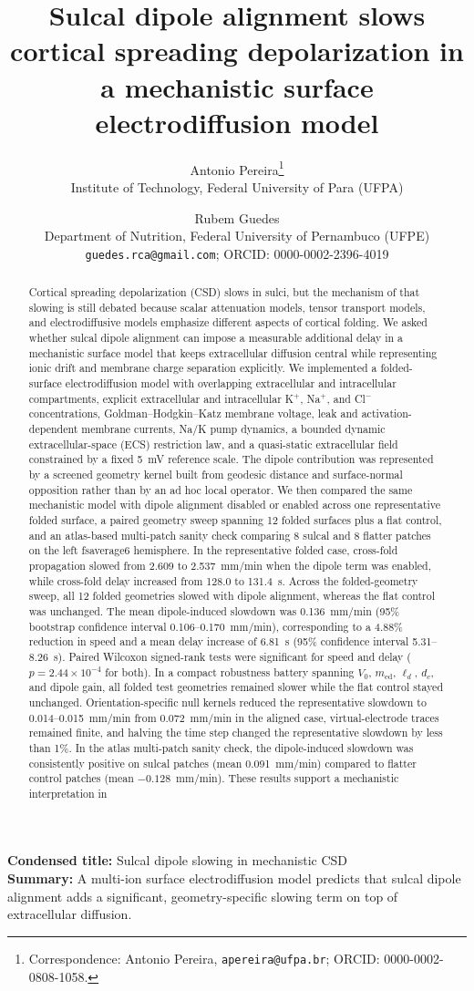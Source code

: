 \documentclass[12pt]{article}
\title{Sulcal dipole alignment slows cortical spreading depolarization in a mechanistic surface electrodiffusion model}
\author{
Antonio Pereira\thanks{Correspondence: Antonio Pereira, \texttt{apereira@ufpa.br}; ORCID: 0000-0002-0808-1058.}\\
\small Institute of Technology, Federal University of Para (UFPA)
\and
Rubem Guedes\\
\small Department of Nutrition, Federal University of Pernambuco (UFPE)\\
\small \texttt{guedes.rca@gmail.com}; ORCID: 0000-0002-2396-4019
}
\date{}
\newcommand{\ShortTitle}{Sulcal dipole slowing in mechanistic CSD}
\newcommand{\TOCSummary}{A multi-ion surface electrodiffusion model predicts that sulcal dipole alignment adds a significant, geometry-specific slowing term on top of extracellular diffusion.}
\begin{document}
\maketitle

\begin{center}
\parbox{0.95\textwidth}{\small
\textbf{Condensed title:} \ShortTitle\\
\textbf{Summary:} \TOCSummary}
\end{center}

\begin{abstract}
Cortical spreading depolarization (CSD) slows in sulci, but the mechanism of that slowing is still debated because scalar attenuation models, tensor transport models, and electrodiffusive models emphasize different aspects of cortical folding. We asked whether sulcal dipole alignment can impose a measurable additional delay in a mechanistic surface model that keeps extracellular diffusion central while representing ionic drift and membrane charge separation explicitly. We implemented a folded-surface electrodiffusion model with overlapping extracellular and intracellular compartments, explicit extracellular and intracellular K$^+$, Na$^+$, and Cl$^-$ concentrations, Goldman--Hodgkin--Katz membrane voltage, leak and activation-dependent membrane currents, Na/K pump dynamics, a bounded dynamic extracellular-space (ECS) restriction law, and a quasi-static extracellular field constrained by a fixed 5~mV reference scale. The dipole contribution was represented by a screened geometry kernel built from geodesic distance and surface-normal opposition rather than by an ad hoc local operator. We then compared the same mechanistic model with dipole alignment disabled or enabled across one representative folded surface, a paired geometry sweep spanning 12 folded surfaces plus a flat control, and an atlas-based multi-patch sanity check comparing 8 sulcal and 8 flatter patches on the left fsaverage6 hemisphere. In the representative folded case, cross-fold propagation slowed from 2.609 to 2.537~mm/min when the dipole term was enabled, while cross-fold delay increased from 128.0 to 131.4~s. Across the folded-geometry sweep, all 12 folded geometries slowed with dipole alignment, whereas the flat control was unchanged. The mean dipole-induced slowdown was 0.136~mm/min (95\% bootstrap confidence interval 0.106--0.170~mm/min), corresponding to a 4.88\% reduction in speed and a mean delay increase of 6.81~s (95\% confidence interval 5.31--8.26~s). Paired Wilcoxon signed-rank tests were significant for speed and delay ($p=2.44\times 10^{-4}$ for both). In a compact robustness battery spanning $V_0$, $m_{\mathrm{ed}}$, $\ell_d$, $d_c$, and dipole gain, all folded test geometries remained slower while the flat control stayed unchanged. Orientation-specific null kernels reduced the representative slowdown to 0.014--0.015~mm/min from 0.072~mm/min in the aligned case, virtual-electrode traces remained finite, and halving the time step changed the representative slowdown by less than 1\%. In the atlas multi-patch sanity check, the dipole-induced slowdown was consistently positive on sulcal patches (mean 0.091~mm/min) compared to flatter control patches (mean $-0.128$~mm/min). These results support a mechanistic interpretation in 
\end{abstract}
\end{document}
